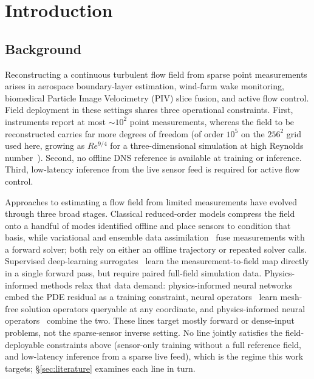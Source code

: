 \chapter{Introduction}
\label{ch:intro}

\section{Background}
\label{sec:intro_background}

Reconstructing a continuous turbulent flow field from sparse point measurements arises in aerospace boundary-layer estimation, wind-farm wake monitoring, biomedical Particle Image Velocimetry (PIV) slice fusion, and active flow control. Field deployment in these settings shares three operational constraints. First, instruments report at most $\sim 10^2$ point measurements, whereas the field to be reconstructed carries far more degrees of freedom (of order $10^5$ on the $256^2$ grid used here, growing as $Re^{9/4}$ for a three-dimensional simulation at high Reynolds number~\cite{Pope2000}). Second, no offline DNS reference is available at training or inference. Third, low-latency inference from the live sensor feed is required for active flow control.

Approaches to estimating a flow field from limited measurements have evolved through three broad stages. Classical reduced-order models compress the field onto a handful of modes identified offline and place sensors to condition that basis, while variational and ensemble data assimilation~\cite{Asch2016DA} fuse measurements with a forward solver; both rely on either an offline trajectory or repeated solver calls. Supervised deep-learning surrogates~\cite{VinuesaBrunton2022NCS} learn the measurement-to-field map directly in a single forward pass, but require paired full-field simulation data. Physics-informed methods relax that data demand: physics-informed neural networks~\cite{Raissi2019JCP} embed the PDE residual as a training constraint, neural operators~\cite{Lu2021NMI} learn mesh-free solution operators queryable at any coordinate, and physics-informed neural operators~\cite{Li2021PINO} combine the two. These lines target mostly forward or dense-input problems, not the sparse-sensor inverse setting. No line jointly satisfies the field-deployable constraints above (sensor-only training without a full reference field, and low-latency inference from a sparse live feed), which is the regime this work targets; \S\ref{sec:literature} examines each line in turn.

